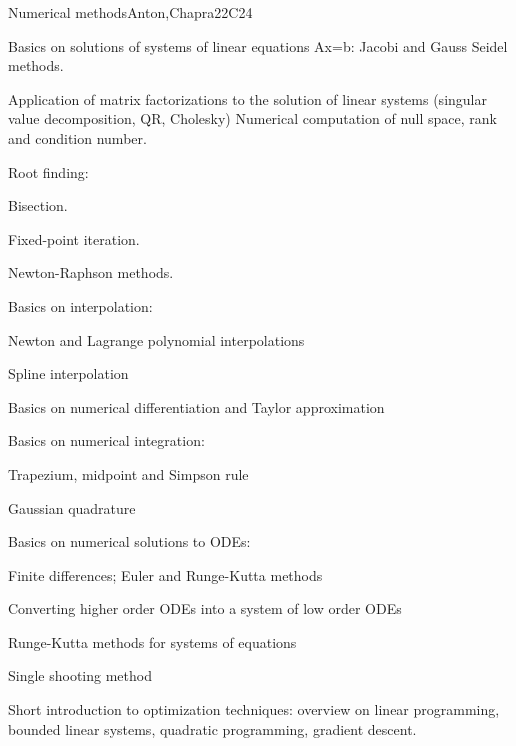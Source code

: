 \begin{syllabus}
\begin{unit}{Numerical methods}{}{Anton,Chapra}{22}{C24}
   \begin{topics}
    \item Basics on solutions of systems of linear equations Ax=b: Jacobi and Gauss Seidel methods.
    \item Application of matrix factorizations to the solution of linear systems (singular value decomposition, QR, Cholesky) Numerical computation of null space, rank and condition number.
    \item Root finding:
	  \begin{subtopics}
	    \item Bisection.
	    \item Fixed-point iteration.
	    \item Newton-Raphson methods.
	  \end{subtopics}
    \item Basics on interpolation:
	  \begin{subtopics}
	    \item Newton and Lagrange polynomial interpolations
	    \item Spline interpolation
	  \end{subtopics}
    \item Basics on numerical differentiation and Taylor approximation
    \item Basics on numerical integration:
	  \begin{subtopics}
	    \item Trapezium, midpoint and Simpson rule
	    \item Gaussian quadrature
	  \end{subtopics}
    \item Basics on numerical solutions to ODEs:
	  \begin{subtopics}
	    \item Finite differences; Euler and Runge-Kutta methods
	    \item Converting higher order ODEs into a system of low order ODEs
	    \item Runge-Kutta methods for systems of equations
	    \item Single shooting method
	  \end{subtopics}
    \item Short introduction to optimization techniques: overview on linear programming, bounded linear systems, quadratic programming, gradient descent.
    \end{topics}


\end{unit}
\end{syllabus}
